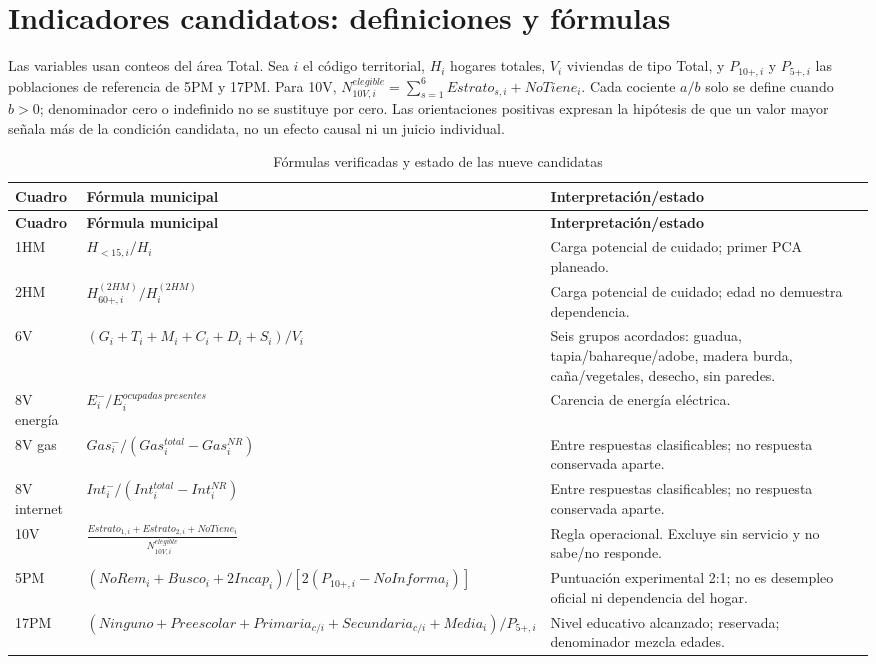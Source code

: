 \documentclass[11pt,a4paper]{article}
\begin{document}
\clearpage
\section{Indicadores candidatos: definiciones y fórmulas}

Las variables usan conteos del área Total. Sea $i$ el código territorial, $H_i$ hogares totales, $V_i$ viviendas de tipo Total, y $P_{10+,i}$ y $P_{5+,i}$ las poblaciones de referencia de 5PM y 17PM. Para 10V, $N^{elegible}_{10V,i}=\sum_{s=1}^{6}Estrato_{s,i}+NoTiene_i$. Cada cociente $a/b$ solo se define cuando $b>0$; denominador cero o indefinido no se sustituye por cero. Las orientaciones positivas expresan la hipótesis de que un valor mayor señala más de la condición candidata, no un efecto causal ni un juicio individual.

\begin{longtable}{P{0.15\textwidth}P{0.50\textwidth}P{0.26\textwidth}}
\caption{Fórmulas verificadas y estado de las nueve candidatas}\label{tab:formulas}\\
\toprule
\textbf{Cuadro} & \textbf{Fórmula municipal} & \textbf{Interpretación/estado}\\
\midrule
\endfirsthead
\toprule\textbf{Cuadro} & \textbf{Fórmula municipal} & \textbf{Interpretación/estado}\\\midrule
\endhead
1HM & $H_{<15,i}/H_i$ & Carga potencial de cuidado; primer PCA planeado.\\
2HM & $H_{60+,i}^{(2HM)}/H_i^{(2HM)}$ & Carga potencial de cuidado; edad no demuestra dependencia.\\
6V & $(G_i+T_i+M_i+C_i+D_i+S_i)/V_i$ & Seis grupos acordados: guadua, tapia/bahareque/adobe, madera burda, caña/vegetales, desecho, sin paredes.\\
8V energía & $E_i^{-}/E_i^{ocupadas\ presentes}$ & Carencia de energía eléctrica.\\
8V gas & $Gas_i^{-}/(Gas_i^{total}-Gas_i^{NR})$ & Entre respuestas clasificables; no respuesta conservada aparte.\\
8V internet & $Int_i^{-}/(Int_i^{total}-Int_i^{NR})$ & Entre respuestas clasificables; no respuesta conservada aparte.\\
10V & $\frac{Estrato_{1,i}+Estrato_{2,i}+NoTiene_i}{N^{elegible}_{10V,i}}$ & Regla operacional. Excluye sin servicio y no sabe/no responde.\\
5PM & $(NoRem_i+Busco_i+2Incap_i)/[2(P_{10+,i}-NoInforma_i)]$ & Puntuación experimental 2:1; no es desempleo oficial ni dependencia del hogar.\\
17PM & $(Ninguno+Preescolar+Primaria_{c/i}+Secundaria_{c/i}+Media_i)/P_{5+,i}$ & Nivel educativo alcanzado; reservada; denominador mezcla edades.\\
\bottomrule
\end{longtable}
\end{document}
